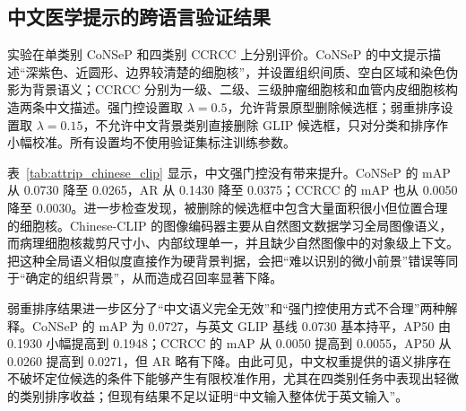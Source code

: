 \subsection{中文医学提示的跨语言验证结果}
实验在单类别 CoNSeP 和四类别 CCRCC 上分别评价。CoNSeP 的中文提示描述“深紫色、近圆形、边界较清楚的细胞核”，并设置组织间质、空白区域和染色伪影为背景语义；CCRCC 分别为一级、二级、三级肿瘤细胞核和血管内皮细胞核构造两条中文描述。强门控设置取 $\lambda=0.5$，允许背景原型删除候选框；弱重排序设置取 $\lambda=0.15$，不允许中文背景类别直接删除 GLIP 候选框，只对分类和排序作小幅校准。所有设置均不使用验证集标注训练参数。

\begin{table}[htbp]
\centering
\caption{中文语义重排序结果}
\label{tab:attrip_chinese_clip}
\end{table}

表~\ref{tab:attrip_chinese_clip} 显示，中文强门控没有带来提升。CoNSeP 的 mAP 从 0.0730 降至 0.0265，AR 从 0.1430 降至 0.0375；CCRCC 的 mAP 也从 0.0050 降至 0.0030。进一步检查发现，被删除的候选框中包含大量面积很小但位置合理的细胞核。Chinese-CLIP 的图像编码器主要从自然图文数据学习全局图像语义，而病理细胞核裁剪尺寸小、内部纹理单一，并且缺少自然图像中的对象级上下文。把这种全局语义相似度直接作为硬背景判据，会把“难以识别的微小前景”错误等同于“确定的组织背景”，从而造成召回率显著下降。

弱重排序结果进一步区分了“中文语义完全无效”和“强门控使用方式不合理”两种解释。CoNSeP 的 mAP 为 0.0727，与英文 GLIP 基线 0.0730 基本持平，AP50 由 0.1930 小幅提高到 0.1948；CCRCC 的 mAP 从 0.0050 提高到 0.0055，AP50 从 0.0260 提高到 0.0271，但 AR 略有下降。由此可见，中文权重提供的语义排序在不破坏定位候选的条件下能够产生有限校准作用，尤其在四类别任务中表现出轻微的类别排序收益；但现有结果不足以证明“中文输入整体优于英文输入”。


